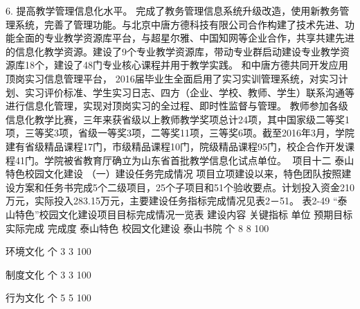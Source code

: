 6. 提高教学管理信息化水平。
完成了教务管理信息系统升级改造，使用新教务管理系统，完善了管理功能。与北京中唐方德科技有限公司合作构建了技术先进、功能全面的专业教学资源库平台，与超星尔雅、中国知网等企业合作，共享共建先进的信息化教学资源。建设了9个专业教学资源库，带动专业群启动建设专业教学资源库18个，建设了48门专业核心课程并用于教学实践。
和中唐方德共同开发应用顶岗实习信息管理平台， 2016届毕业生全面启用了实习实训管理系统，对实习计划、实习评价标准、学生实习日志、四方（企业、学校、教师、学生）联系沟通等进行信息化管理，实现对顶岗实习的全过程、即时性监督与管理。
教师参加各级信息化教学比赛，三年来获省级以上教师教学奖项总计24项，其中国家级二等奖1项，三等奖3项，省级一等奖3项，二等奖11项，三等奖6项。截至2016年3月，学院建有省级精品课程17门，市级精品课程10门，院级精品课程95门，校企合作开发课程41门。学院被省教育厅确立为山东省首批教学信息化试点单位。
项目十二    泰山特色校园文化建设
（一）建设任务完成情况
项目立项建设以来，特色团队按照建设方案和任务书完成5个二级项目，25个子项目和51个验收要点。计划投入资金210万元，实际投入283.15万元，主要建设任务指标完成情况见表2－51。
表2-49  “泰山特色”校园文化建设项目目标完成情况一览表
建设内容
关键指标
单位
预期目标
实际完成
完成度
泰山特色
校园文化建设
泰山书院
个
8
8
100%

环境文化
个
3
3
100%

制度文化
个
3
3
100%

行为文化
个
5
5
100%

